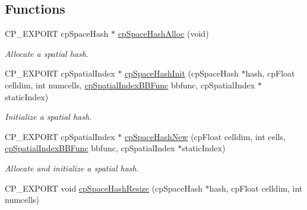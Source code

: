 \subsection*{Functions}
\begin{DoxyCompactItemize}
\item 
\mbox{\label{group__cpSpatialIndex_ga351267ecb0327759b05c9fe3a2936729}} 
C\+P\+\_\+\+E\+X\+P\+O\+RT cp\+Space\+Hash $\ast$ \hyperlink{group__cpSpatialIndex_ga351267ecb0327759b05c9fe3a2936729}{cp\+Space\+Hash\+Alloc} (void)
\begin{DoxyCompactList}\small\item\em Allocate a spatial hash. \end{DoxyCompactList}\item 
\mbox{\label{group__cpSpatialIndex_gad9e01a2896f33d2a7d8cf3d2cf915dd8}} 
C\+P\+\_\+\+E\+X\+P\+O\+RT cp\+Spatial\+Index $\ast$ \hyperlink{group__cpSpatialIndex_gad9e01a2896f33d2a7d8cf3d2cf915dd8}{cp\+Space\+Hash\+Init} (cp\+Space\+Hash $\ast$hash, cp\+Float celldim, int numcells, \hyperlink{group__cpSpatialIndex_gaa8cf991cadcee1fbb6ee9379a0a6e0ea}{cp\+Spatial\+Index\+B\+B\+Func} bbfunc, cp\+Spatial\+Index $\ast$static\+Index)
\begin{DoxyCompactList}\small\item\em Initialize a spatial hash. \end{DoxyCompactList}\item 
\mbox{\label{group__cpSpatialIndex_gaf795cd21fee27611d2e02b2085a3a5e8}} 
C\+P\+\_\+\+E\+X\+P\+O\+RT cp\+Spatial\+Index $\ast$ \hyperlink{group__cpSpatialIndex_gaf795cd21fee27611d2e02b2085a3a5e8}{cp\+Space\+Hash\+New} (cp\+Float celldim, int cells, \hyperlink{group__cpSpatialIndex_gaa8cf991cadcee1fbb6ee9379a0a6e0ea}{cp\+Spatial\+Index\+B\+B\+Func} bbfunc, cp\+Spatial\+Index $\ast$static\+Index)
\begin{DoxyCompactList}\small\item\em Allocate and initialize a spatial hash. \end{DoxyCompactList}\item 
C\+P\+\_\+\+E\+X\+P\+O\+RT void \hyperlink{group__cpSpatialIndex_gac6ac718f3e9509abc2c01d256d4217a5}{cp\+Space\+Hash\+Resize} (cp\+Space\+Hash $\ast$hash, cp\+Float celldim, int numcells)
\item 
\mbox{\label{group__cpSpatialIndex_gab596db9af8a27a956bc656c77de44cea}} 

\end{DoxyCompactItemize}
